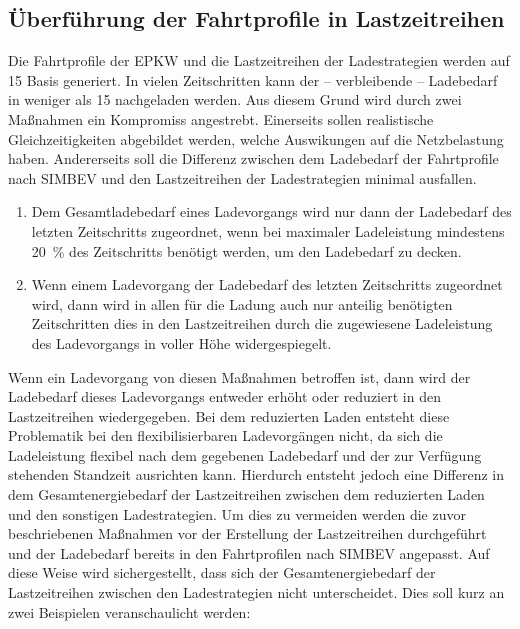 \subsection{Überführung der Fahrtprofile in Lastzeitreihen}

Die Fahrtprofile der \gls{EPKW} und die Lastzeitreihen der Ladestrategien werden auf \SI{15}{\Minuten} Basis generiert.
In vielen Zeitschritten kann der {--} verbleibende {--} Ladebedarf in weniger als \SI{15}{\Minuten} nachgeladen werden.
Aus diesem Grund wird durch zwei Maßnahmen ein Kompromiss angestrebt.
Einerseits sollen realistische Gleichzeitigkeiten abgebildet werden, welche Auswikungen auf die Netzbelastung haben.
Andererseits soll die Differenz zwischen dem Ladebedarf der Fahrtprofile nach \gls{SIMBEV} und den Lastzeitreihen der Ladestrategien minimal ausfallen.

\begin{enumerate}
	\item Dem Gesamtladebedarf eines Ladevorgangs wird nur dann der Ladebedarf des letzten Zeitschritts zugeordnet, wenn bei maximaler Ladeleistung mindestens \SI{20}{\percent} des Zeitschritts benötigt werden, um den Ladebedarf zu decken.
	\item Wenn einem Ladevorgang der Ladebedarf des letzten Zeitschritts zugeordnet wird, dann wird in allen für die Ladung auch nur anteilig benötigten Zeitschritten dies in den Lastzeitreihen durch die zugewiesene Ladeleistung des Ladevorgangs in voller Höhe widergespiegelt.
\end{enumerate}

Wenn ein Ladevorgang von diesen Maßnahmen betroffen ist, dann wird der Ladebedarf dieses Ladevorgangs entweder erhöht oder reduziert in den Lastzeitreihen wiedergegeben.
Bei dem reduzierten Laden entsteht diese Problematik bei den flexibilisierbaren Ladevorgängen nicht, da sich die Ladeleistung flexibel nach dem gegebenen Ladebedarf und der zur Verfügung stehenden Standzeit ausrichten kann.
Hierdurch entsteht jedoch eine Differenz in dem Gesamtenergiebedarf der Lastzeitreihen zwischen dem reduzierten Laden und den sonstigen Ladestrategien.
Um dies zu vermeiden werden die zuvor beschriebenen Maßnahmen vor der Erstellung der Lastzeitreihen durchgeführt und der Ladebedarf bereits in den Fahrtprofilen nach \gls{SIMBEV} angepasst.
Auf diese Weise wird sichergestellt, dass sich der Gesamtenergiebedarf der Lastzeitreihen zwischen den Ladestrategien nicht unterscheidet.
Dies soll kurz an zwei Beispielen veranschaulicht werden:

